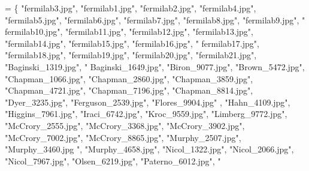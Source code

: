 \begin{DoxyCode}
= \{ \textcolor{stringliteral}{"fermilab3.jpg"}, \textcolor{stringliteral}{"fermilab1.jpg"}, \textcolor{stringliteral}{"fermilab2.jpg"}, \textcolor{stringliteral}{"fermilab4.jpg"},
            \textcolor{stringliteral}{"fermilab5.jpg"}, \textcolor{stringliteral}{"fermilab6.jpg"}, \textcolor{stringliteral}{"fermilab7.jpg"}, \textcolor{stringliteral}{"fermilab8.jpg"}, \textcolor{stringliteral}{"fermilab9.jpg"}, \textcolor{stringliteral}{"
      fermilab10.jpg"}, \textcolor{stringliteral}{"fermilab11.jpg"},
            \textcolor{stringliteral}{"fermilab12.jpg"}, \textcolor{stringliteral}{"fermilab13.jpg"}, \textcolor{stringliteral}{"fermilab14.jpg"}, \textcolor{stringliteral}{"fermilab15.jpg"}, \textcolor{stringliteral}{"fermilab16.jpg"}, \textcolor{stringliteral}{"
      fermilab17.jpg"},
            \textcolor{stringliteral}{"fermilab18.jpg"}, \textcolor{stringliteral}{"fermilab19.jpg"}, \textcolor{stringliteral}{"fermilab20.jpg"}, \textcolor{stringliteral}{"fermilab21.jpg"}, \textcolor{stringliteral}{"Baginski\_1319.jpg"}, \textcolor{stringliteral}{"
      Baginski\_1649.jpg"},
            \textcolor{stringliteral}{"Biron\_9077.jpg"}, \textcolor{stringliteral}{"Brown\_5472.jpg"}, \textcolor{stringliteral}{"Chapman\_1066.jpg"}, \textcolor{stringliteral}{"Chapman\_2860.jpg"}, \textcolor{stringliteral}{"Chapman\_3859.jpg"},
       \textcolor{stringliteral}{"Chapman\_4721.jpg"},
            \textcolor{stringliteral}{"Chapman\_7196.jpg"}, \textcolor{stringliteral}{"Chapman\_8814.jpg"}, \textcolor{stringliteral}{"Dyer\_3235.jpg"}, \textcolor{stringliteral}{"Ferguson\_2539.jpg"}, \textcolor{stringliteral}{"Flores\_9904.jpg"}
      , \textcolor{stringliteral}{"Hahn\_4109.jpg"},
            \textcolor{stringliteral}{"Higgins\_7961.jpg"}, \textcolor{stringliteral}{"Iraci\_6742.jpg"}, \textcolor{stringliteral}{"Kroc\_9559.jpg"}, \textcolor{stringliteral}{"Limberg\_9772.jpg"}, \textcolor{stringliteral}{"McCrory\_2555.jpg"}, \textcolor{stringliteral}{
      "McCrory\_3368.jpg"},
            \textcolor{stringliteral}{"McCrory\_3902.jpg"}, \textcolor{stringliteral}{"McCrory\_7002.jpg"}, \textcolor{stringliteral}{"McCrory\_8865.jpg"}, \textcolor{stringliteral}{"Murphy\_2507.jpg"}, \textcolor{stringliteral}{"Murphy\_3460.jpg
      "}, \textcolor{stringliteral}{"Murphy\_4658.jpg"},
            \textcolor{stringliteral}{"Nicol\_1322.jpg"}, \textcolor{stringliteral}{"Nicol\_2066.jpg"}, \textcolor{stringliteral}{"Nicol\_7967.jpg"}, \textcolor{stringliteral}{"Olsen\_6219.jpg"}, \textcolor{stringliteral}{"Paterno\_6012.jpg"}, \textcolor{stringliteral}{"
}
\end{DoxyCode}
